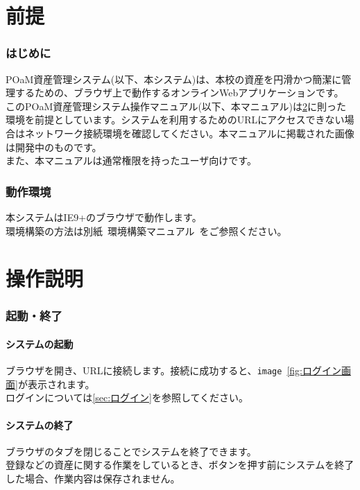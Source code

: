 \documentclass[11ptm]{jsarticle}
\begin{document}
\part{前提}
\hrulefill


\section{はじめに}
\label{sec:はじめに}
POaM資産管理システム(以下、本システム)は、本校の資産を円滑かつ簡潔に管理するための、ブラウザ上で動作するオンラインWebアプリケーションです。\\
このPOaM資産管理システム操作マニュアル(以下、本マニュアル)は\ref{sec:動作環境}に則った環境を前提としています。システムを利用するためのURLにアクセスできない場合はネットワーク接続環境を確認してください。本マニュアルに掲載された画像は開発中のものです。\\
また、本マニュアルは通常権限を持ったユーザ向けです。


\section{動作環境}
\label{sec:動作環境}
本システムはIE9+のブラウザで動作します。\\
環境構築の方法は別紙\ 環境構築マニュアル\ をご参照ください。


\clearpage
\part{操作説明}
\hrulefill


\section{起動・終了}
\label{sec:起動・終了}

\subsection{システムの起動}
\label{sec:システムの起動}
ブラウザを開き、URLに接続します。接続に成功すると、{\tt image}\ \ref{fig:ログイン画面}が表示されます。\\
ログインについては\ref{sec:ログイン}を参照してください。

\subsection{システムの終了}
\label{sec:システムの終了}
ブラウザのタブを閉じることでシステムを終了できます。\\
登録などの資産に関する作業をしているとき、ボタンを押す前にシステムを終了した場合、作業内容は保存されません。
\end{document}
